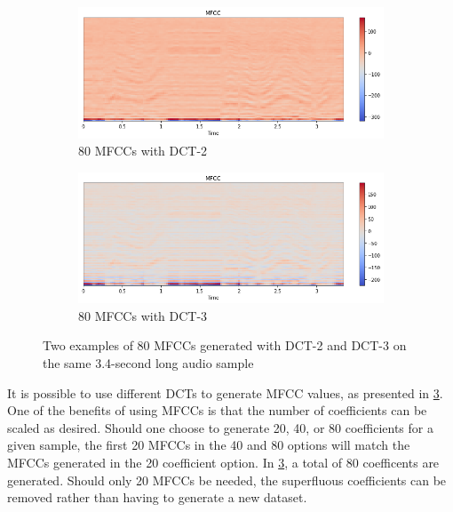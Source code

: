 \begin{figure}
    \centering
    \begin{subfigure}[b]{.45\textwidth}
        \centering
        \includegraphics[width=\textwidth]{figures/mfcc2.png}
        \caption{80 MFCCs with DCT-2}
        \label{sfig:mfcc2example}
    \end{subfigure}
    \hfill
    \begin{subfigure}[b]{.45\textwidth}
        \centering
        \includegraphics[width=\textwidth]{figures/mfcc3.png}
        \caption{80 MFCCs with DCT-3}
        \label{sfig:mfcc3example}
    \end{subfigure}
    \caption{Two examples of 80 MFCCs generated with DCT-2 and DCT-3 on the same 3.4-second long audio sample}
    \label{fig:mfccexample}
\end{figure}

It is possible to use different DCTs to generate MFCC values, as presented in \cref{fig:mfccexample}.
One of the benefits of using MFCCs is that the number of coefficients can be scaled as desired.
Should one choose to generate 20, 40, or 80 coefficients for a given sample, the first 20 MFCCs in the 40 and 80 options will match the MFCCs generated in the 20 coefficient option.
In \cref{fig:mfccexample}, a total of 80 coefficents are generated.
Should only 20 MFCCs be needed, the superfluous coefficients can be removed rather than having to generate a new dataset.

